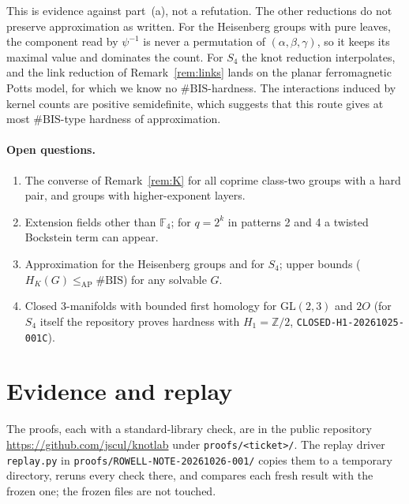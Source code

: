 \documentclass[11pt]{article}
\theoremstyle{definition}
\theoremstyle{remark}
\newcommand{\F}{\mathbb{F}}
\newcommand{\Z}{\mathbb{Z}}
\begin{document}
This is evidence against part~(a), not a refutation. The other reductions do
not preserve approximation as written. For the Heisenberg groups with pure
leaves, the component read by $\psi^{-1}$ is never a permutation of
$(\alpha,\beta,\gamma)$, so it keeps its maximal value and dominates the count.
For $S_4$ the knot reduction interpolates, and the link reduction of
Remark~\ref{rem:links} lands on the planar ferromagnetic Potts model, for which
we know no $\#\mathrm{BIS}$-hardness. The interactions induced by kernel counts
are positive semidefinite, which suggests that this route gives at most
$\#\mathrm{BIS}$-type hardness of approximation.

\paragraph{Open questions.}
\begin{enumerate}
\item The converse of Remark~\ref{rem:K} for all coprime class-two groups with
a hard pair, and groups with higher-exponent layers.
\item Extension fields other than $\F_4$; for $q=2^k$ in patterns 2 and 4 a
twisted Bockstein term can appear.
\item Approximation for the Heisenberg groups and for $S_4$; upper bounds
($H_K(G)\le_{\mathrm{AP}}\#\mathrm{BIS}$) for any solvable $G$.
\item Closed 3-manifolds with bounded first homology for $\mathrm{GL}(2,3)$
and $2O$ (for $S_4$ itself the repository proves hardness with $H_1=\Z/2$,
\texttt{CLOSED-H1-20261025-001C}).
\end{enumerate}

\section{Evidence and replay}\label{sec:evidence}

The proofs, each with a standard-library check, are in the public
repository \url{https://github.com/jscul/knotlab} under
\texttt{proofs/<ticket>/}. The replay driver \texttt{replay.py} in
\texttt{proofs/ROWELL-NOTE-20261026-001/} copies them to a temporary directory,
reruns every check there, and compares each fresh result with the frozen one;
the frozen files are not touched.
\end{document}
